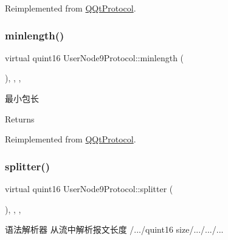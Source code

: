 Reimplemented from \mbox{\hyperlink{class_q_qt_protocol_af41bc3116abbbcfc9af45e151a253ff7}{Q\+Qt\+Protocol}}.

\mbox{\label{class_user_node9_protocol_a52cf6005d9ef8a27f5a38a5cc4e5b7d8}} 
\subsubsection{\texorpdfstring{minlength()}{minlength()}}
{\footnotesize\ttfamily virtual quint16 User\+Node9\+Protocol\+::minlength (\begin{DoxyParamCaption}{ }\end{DoxyParamCaption})\hspace{0.3cm}{\ttfamily [inline]}, {\ttfamily [override]}, {\ttfamily [protected]}, {\ttfamily [virtual]}}



最小包长 

\begin{DoxyReturn}{Returns}

\end{DoxyReturn}


Reimplemented from \mbox{\hyperlink{class_q_qt_protocol_a2b00f53d3dd0eed817eeecff422891f3}{Q\+Qt\+Protocol}}.

\mbox{\label{class_user_node9_protocol_a7f4994e5a7c931a6581cf30f55f4c34f}} 
\subsubsection{\texorpdfstring{splitter()}{splitter()}}
{\footnotesize\ttfamily virtual quint16 User\+Node9\+Protocol\+::splitter (\begin{DoxyParamCaption}\item[{const Q\+Byte\+Array \&}]{ }\end{DoxyParamCaption})\hspace{0.3cm}{\ttfamily [inline]}, {\ttfamily [override]}, {\ttfamily [protected]}, {\ttfamily [virtual]}}



语法解析器 从流中解析报文长度 /.../quint16 size/.../.../... 


